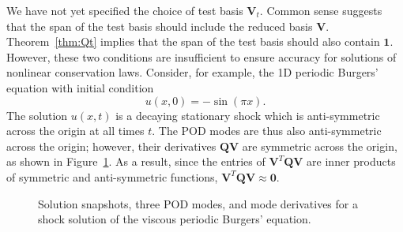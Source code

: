 \documentclass[review]{siamart171218}
\theoremstyle{assumption}
\begin{document}
We have not yet specified the choice of test basis $\bm{V}_t$.  Common sense suggests that the span of the test basis should include the reduced basis $\bm{V}$.  Theorem~\ref{thm:Qt} implies that the span of the test basis should also contain $\bm{1}$.  However, these two conditions are insufficient to ensure accuracy for solutions of nonlinear conservation laws.  Consider, for example, the 1D periodic Burgers' equation with initial condition 
\[
u(x,0) = -\sin(\pi x).
\]
The solution $u(x,t)$ is a decaying stationary shock which is anti-symmetric across the origin at all times $t$.  The POD modes are thus also anti-symmetric across the origin; however, their derivatives $\bm{Q}\bm{V}$ are symmetric across the origin, as shown in Figure~\ref{fig:modeQ}.  As a result, since the entries of $\bm{V}^T\bm{Q}\bm{V}$ are inner products of symmetric and anti-symmetric functions, $\bm{V}^T\bm{Q}\bm{V} \approx \bm{0}$.
\begin{figure}[!h]
\centering
{}
\hspace{.5em}
\hspace{.5em}
\caption{Solution snapshots, three POD modes, and mode derivatives for a shock solution of the viscous periodic Burgers' equation. }
\label{fig:modeQ}
\end{figure}
\end{document}
